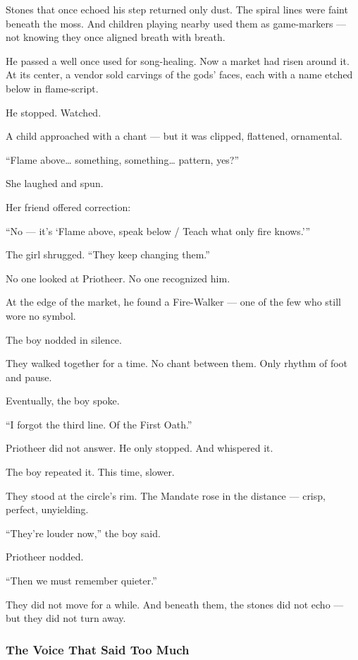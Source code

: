 \documentclass[12pt]{article}
\begin{document}
Stones that once echoed his step returned only dust.  
The spiral lines were faint beneath the moss.  
And children playing nearby used them as game-markers —  
not knowing they once aligned breath with breath.

He passed a well once used for song-healing.  
Now a market had risen around it.  
At its center, a vendor sold carvings of the gods’ faces,  
each with a name etched below in flame-script.

He stopped.  
Watched.

A child approached with a chant —  
but it was clipped, flattened, ornamental.

 “Flame above… something, something… pattern, yes?”

She laughed and spun.

Her friend offered correction:

 “No — it’s ‘Flame above, speak below / Teach what only fire knows.’”

The girl shrugged.  
 “They keep changing them.”

No one looked at Priotheer.  
No one recognized him.

At the edge of the market, he found a Fire-Walker — one of the few who still wore no symbol.

The boy nodded in silence.

They walked together for a time.  
No chant between them.  
Only rhythm of foot and pause.

Eventually, the boy spoke.

 “I forgot the third line.  
 Of the First Oath.”

Priotheer did not answer.  
He only stopped.  
And whispered it.

The boy repeated it.  
This time, slower.

They stood at the circle’s rim.  
The Mandate rose in the distance — crisp, perfect, unyielding.

 “They’re louder now,” the boy said.

Priotheer nodded.

 “Then we must remember quieter.”

They did not move for a while.  
And beneath them, the stones did not echo —  
but they did not turn away.

\dotfill

\subsubsection*{The Voice That Said Too Much}
\end{document}
